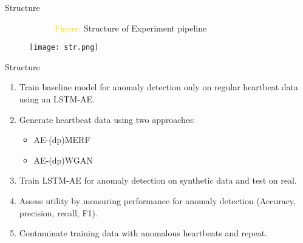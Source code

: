 \begin{frame}{Structure}
    
    \begin{figure}[h]
        \begin{flushleft}
            ~~~~~~\textcolor{gold}{Figure: }Structure of Experiment pipeline
        \end{flushleft}
        \centering
        \texttt{[image: str.png]}
    \end{figure}
\end{frame}

\begin{frame}{Structure}
    \begin{enumerate}
        \item<1-> Train \alert{baseline model} for anomaly detection only on regular heartbeat data using an LSTM-AE.
        \item<2->  \alert{Generate heartbeat} data using two approaches:
        \begin{itemize}
            \item<2-> [--] AE-(dp)MERF
            \item<2-> [--] AE-(dp)WGAN
        \end{itemize}
        \item<3->  Train LSTM-AE for \alert{anomaly detection on synthetic data} and \alert{test on real}.
        \item<3-> Assess \alert{utility} by measuring performance for anomaly detection (Accuracy, precision, recall, F1). 
        \item<4->  \alert{Contaminate} training data with anomalous heartbeats and repeat.
    \end{enumerate}
\end{frame}



